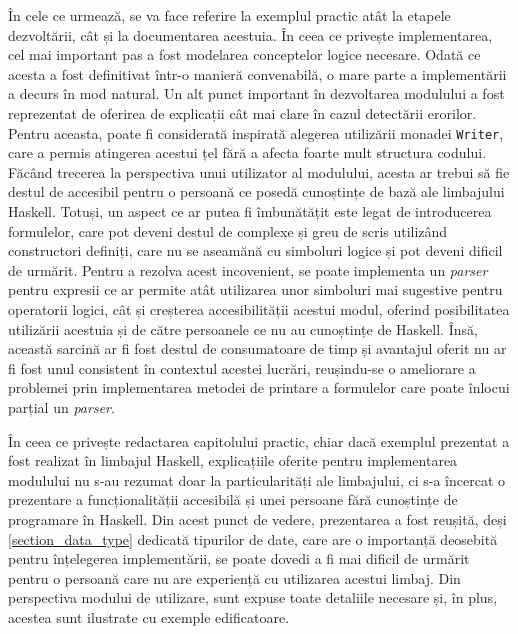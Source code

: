 \documentclass[12pt, openany]{book}
\newcommand{\mysectionreference}[1]{\autoref{#1}}
\begin{document}
            \par{}
                În cele ce urmează, se va face referire la exemplul practic atât la etapele dezvoltării, cât și la 
                documentarea acestuia. În ceea ce privește implementarea, cel mai important pas a fost modelarea 
                conceptelor logice necesare. Odată ce acesta a fost definitivat într-o manieră convenabilă, o mare parte 
                a implementării a decurs în mod natural. Un alt punct important în dezvoltarea modulului a fost 
                reprezentat de oferirea de explicații cât mai clare în cazul detectării erorilor. Pentru aceasta, poate 
                fi considerată inspirată alegerea utilizării monadei \texttt{Writer}, care a permis atingerea acestui 
                țel fără a afecta foarte mult structura codului. Făcând trecerea la perspectiva unui utilizator al 
                modulului, acesta ar trebui să fie destul de accesibil pentru o persoană ce posedă cunoștințe de bază 
                ale limbajului Haskell. Totuși, un aspect ce ar putea fi îmbunătățit este legat de introducerea 
                formulelor, care pot deveni destul de complexe și greu de scris utilizând constructori definiți, care nu
                se aseamănă cu simboluri logice și pot deveni dificil de urmărit. Pentru a rezolva acest incovenient, se 
                poate implementa un \textit{parser} pentru expresii ce ar permite atât utilizarea unor simboluri mai 
                sugestive pentru operatorii logici, cât și creșterea accesibilității acestui modul, oferind 
                posibilitatea utilizării acestuia și de către persoanele ce nu au cunoștințe de Haskell. Însă, această 
                sarcină ar fi fost destul de consumatoare de timp și avantajul oferit nu ar fi fost unul consistent în 
                contextul acestei lucrări, reușindu-se o ameliorare a problemei prin implementarea metodei de printare a 
                formulelor care poate înlocui parțial un \textit{parser}.

            \par{}
                În ceea ce privește redactarea capitolului practic, chiar dacă exemplul prezentat a fost realizat în 
                limbajul Haskell, explicațiile oferite pentru implementarea modulului nu s-au rezumat doar la 
                particularități ale limbajului, ci s-a încercat o prezentare a funcționalității accesibilă și unei 
                persoane fără cunoștințe de programare în Haskell. Din acest punct de vedere, prezentarea a fost 
                reușită, deși \mysectionreference{section_data_type} dedicată tipurilor de date, care are o importanță 
                deosebită pentru înțelegerea implementării, se poate dovedi a fi mai dificil de urmărit pentru o 
                persoană care nu are experiență cu utilizarea acestui limbaj. Din perspectiva modului de 
                utilizare, sunt expuse toate detaliile necesare și, în plus, acestea sunt ilustrate cu exemple 
                edificatoare.
            
\end{document}
